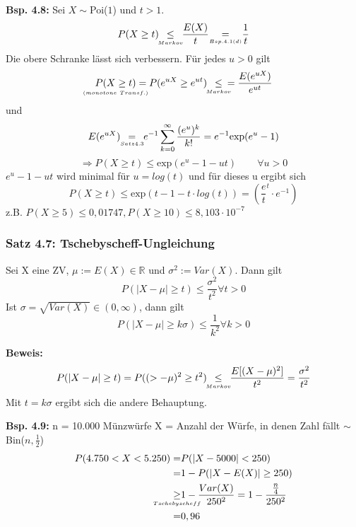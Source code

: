 \documentclass[a4paper,11pt]{article}
\begin{document}
\vspace{6pt}
\noindent\textbf{Bsp. 4.8:}
Sei $X\sim$Poi($1$) und $t>1$.
\[P(X\geq t) \hspace{5pt}\underset{\mathclap{\scriptscriptstyle Markov}}{\leq}\hspace{5pt} \frac{E(X)}{t} \hspace{10pt}\underset{\mathclap{\scriptscriptstyle Bsp. 4.1(d)}}{=}\hspace{10pt} \frac{1}{t}\]
Die obere Schranke lässt sich verbessern. Für jedes $u>0$ gilt 
\[\underset{\mathclap{\scriptscriptstyle (monotone\hspace{3pt}Transf.)}}{P(X\geq t)} = P(e^{uX}\geq e^{ut}) \hspace{5pt}\underset{\mathclap{\scriptscriptstyle Markov}}{\leq}\hspace{5pt} = \frac{E(e^{uX})}{e^{ut}}\]
und 
\[E(e^{uX}) \hspace{5pt}\underset{\mathclap{\scriptscriptstyle Satz 4.3}}{=}\hspace{5pt} e^{-1}\sum_{k=0}^{\infty}\frac{(e^u)^k}{k!} = e^{-1}\text{exp}(e^u-1)\]
\[\Rightarrow P(X\geq t)\leq \text{exp}(e^u-1-ut) \hspace{25pt}\forall u>0\]
$e^u-1-ut$ wird minimal für $u=log(t)$ und für dieses u ergibt sich 
\[P(X\geq t)\leq\text{exp}(t-1-t\cdot log(t)) = (\frac{e}{t}^t\cdot e^{-1})\]
z.B. $P(X\geq5)\leq 0,01747, P(X\geq10)\leq8,103\cdot10^{-7}$

\subsubsection{Satz 4.7: Tschebyscheff-Ungleichung}
Sei X eine ZV, $\mu:=E(X)\in\mathbb{R}$ und $\sigma^2:=Var(X).$ Dann gilt
\[P(|X-\mu|\geq t)\leq \frac{\sigma^2}{t^2} \forall t>0\]
Ist  $\sigma=\sqrt{Var(X)}\in (0,\infty)$, dann gilt
\[P(|X-\mu|\geq k\sigma)\leq\frac{1}{k^2}\forall k>0\]

\noindent\textbf{Beweis:}
\[P(|X-\mu|\geq t) = P((>-\mu)^2\geq t^2) \hspace{5pt}\underset{\mathclap{\scriptscriptstyle Markov}}{\leq}\hspace{5pt} \frac{E[(X-\mu)^2]}{t^2} = \frac{\sigma^2}{t^2}\]
Mit $t=k\sigma$ ergibt sich die andere Behauptung.

\vspace{6pt}
\noindent\textbf{Bsp. 4.9:}
n = 10.000 Münzwürfe
X = Anzahl der Würfe, in denen Zahl fällt $\sim$Bin($n,\frac{1}{2}$)
\begin{align*}
P(4.750 < X < 5.250) =& P(|X-5000|<250)\\
=& 1 - P(|X-E(X)|\geq 250) \\
\underset{\mathclap{\scriptscriptstyle Tschebyscheff}}{\geq}& 1- \frac{Var(X)}{250^2} = 1-\frac{\frac{n}{4}}{250^2} \\
=& 0,96 \\
\end{align*}
\end{document}
